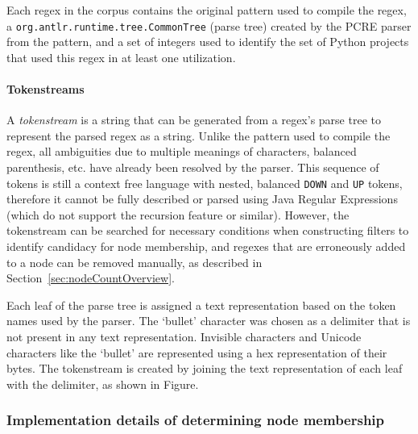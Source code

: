 Each regex in the corpus contains the original pattern used to compile the regex, a {\tt org.antlr.runtime.tree.CommonTree} (parse tree) created by the PCRE parser from the pattern, and a set of integers used to identify the set of Python projects that used this regex in at least one utilization.

\paragraph{Tokenstreams}
A \emph{tokenstream} is a string that can be generated from a regex's parse tree to represent the parsed regex as a string. Unlike the pattern used to compile the regex, all ambiguities due to multiple meanings of characters, balanced parenthesis, etc. have already been resolved by the parser. This sequence of tokens is still a context free language with nested, balanced \verb!DOWN! and \verb!UP! tokens, therefore it cannot be fully described or parsed using Java Regular Expressions (which do not support the recursion feature or similar).  However, the tokenstream can be searched for necessary conditions when constructing filters to identify candidacy for node membership, and regexes that are erroneously added to a node can be removed manually, as described in Section~\ref{sec:nodeCountOverview}.

Each leaf of the parse tree is assigned a text representation based on the token names used by the parser.  The `bullet' character was chosen as a delimiter that is not present in any text representation.  Invisible characters and Unicode characters like the `bullet' are represented using a hex representation of their bytes.  The tokenstream is created by joining the text representation of each leaf with the delimiter, as shown in Figure.


\subsubsection{Implementation details of determining node membership}

